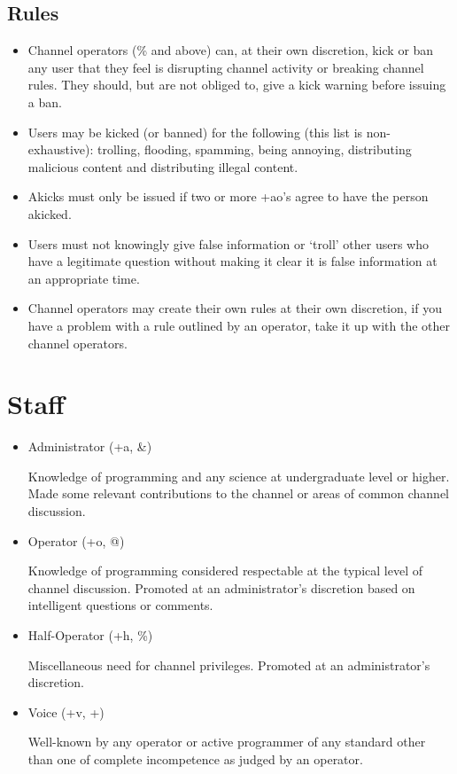\documentclass[11pt,a4paper,notitlepage]{article}
\begin{document}
\subsection{Rules}
\begin{itemize}
\item Channel operators (\% and above) can, at their own discretion, kick or ban any user that they feel is disrupting channel activity or breaking channel rules.
They should, but are not obliged to, give a kick warning before issuing a ban.
\item Users may be kicked (or banned) for the following (this list is non-exhaustive): trolling, flooding, spamming, being annoying, distributing malicious content and distributing illegal content. 
\item Akicks must only be issued if two or more +ao's agree to have the person akicked. 
\item Users must not knowingly give false information or `troll' other users who have a legitimate question without making it clear it is false information at an appropriate time.
\item Channel operators may create their own rules at their own discretion, if you have a problem with a rule outlined by an operator, take it up with the other channel operators.
\end{itemize}

\section{Staff}
\begin{itemize}
\item Administrator (+a, \&)

Knowledge of programming and any science at undergraduate level or higher.
Made some relevant contributions to the channel or areas of common channel discussion.
\item Operator (+o, @)

Knowledge of programming considered respectable at the typical level of channel discussion.
Promoted at an administrator's discretion based on intelligent questions or comments.
\item Half-Operator (+h, \%)

Miscellaneous need for channel privileges.
Promoted at an administrator's discretion.
\item Voice (+v, +)

Well-known by any operator or active programmer of any standard other than one of complete incompetence as judged by an operator.
\end{itemize}
\end{document}
